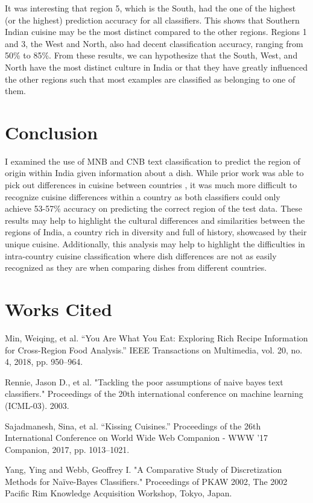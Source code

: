 \documentclass[12pt]{article}
\begin{document}
\noindent It was interesting that region 5, which is the South, had the one of the highest (or the highest) prediction accuracy for all classifiers. This shows that Southern Indian cuisine may be the most distinct compared to the other regions. Regions 1 and 3, the West and North, also had decent classification accuracy, ranging from 50\% to 85\%. From these results, we can hypothesize that the South, West, and North have the most distinct culture in India or that they have greatly influenced the other regions such that most examples are classified as belonging to one of them.\\

\section{Conclusion}

\noindent I examined the use of MNB and CNB text classification to predict the region of origin within India given information about a dish. While prior work was able to pick out differences in cuisine between countries \cite{Min, Sajadmanesh}, it was much more difficult to recognize cuisine differences within a country as both classifiers could only achieve 53-57\% accuracy on predicting the correct region of the test data. These results may help to highlight the cultural differences and similarities between the regions of India, a country rich in diversity and full of history, showcased by their unique cuisine. Additionally, this analysis may help to highlight the difficulties in intra-country cuisine classification where dish differences are not as easily recognized as they are when comparing dishes from different countries.

\section{Works Cited}
\begin{thebibliography}{9}
Min, Weiqing, et al. “You Are What You Eat: Exploring Rich Recipe Information for Cross-Region Food Analysis.” IEEE Transactions on Multimedia, vol. 20, no. 4, 2018, pp. 950–964.

Rennie, Jason D., et al. "Tackling the poor assumptions of naive bayes text classifiers." Proceedings of the 20th international conference on machine learning (ICML-03). 2003.

Sajadmanesh, Sina, et al. “Kissing Cuisines.” Proceedings of the 26th International Conference on World Wide Web Companion - WWW '17 Companion, 2017, pp. 1013–1021.

Yang, Ying and Webb, Geoffrey I. "A Comparative Study of Discretization Methods for Naïve-Bayes Classifiers." Proceedings of PKAW 2002, The 2002 Pacific Rim Knowledge Acquisition Workshop, Tokyo, Japan.
\end{thebibliography}
\end{document}
